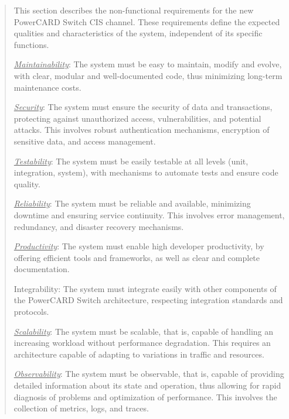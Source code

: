 \documentclass[12pt,a4paper]{report}
\begin{document}
\begin{quote}
This section describes the non-functional requirements for the new
PowerCARD Switch CIS channel. These requirements define the expected
qualities and characteristics of the system, independent of its specific
functions.

\emph{\uline{Maintainability}}: The system must be easy to maintain,
modify and evolve, with clear, modular and well-documented code, thus
minimizing long-term maintenance costs.

\emph{\uline{Security}}: The system must ensure the security of data and
transactions, protecting against unauthorized access, vulnerabilities,
and potential attacks. This involves robust authentication mechanisms,
encryption of sensitive data, and access management.

\emph{\uline{Testability}}: The system must be easily testable at all
levels (unit, integration, system), with mechanisms to automate tests
and ensure code quality.

\emph{\uline{Reliability}}: The system must be reliable and available,
minimizing downtime and ensuring service continuity. This involves error
management, redundancy, and disaster recovery mechanisms.

\emph{\uline{Productivity}}: The system must enable high developer
productivity, by offering efficient tools and frameworks, as well as
clear and complete documentation.

Integrability: The system must integrate easily with other components of
the PowerCARD Switch architecture, respecting integration standards and
protocols.

\emph{\uline{Scalability}}: The system must be scalable, that is,
capable of handling an increasing workload without performance
degradation. This requires an architecture capable of adapting to
variations in traffic and resources.

\emph{\uline{Observability}}: The system must be observable, that is,
capable of providing detailed information about its state and operation,
thus allowing for rapid diagnosis of problems and optimization of
performance. This involves the collection of metrics, logs, and traces.
\end{quote}
\end{document}
